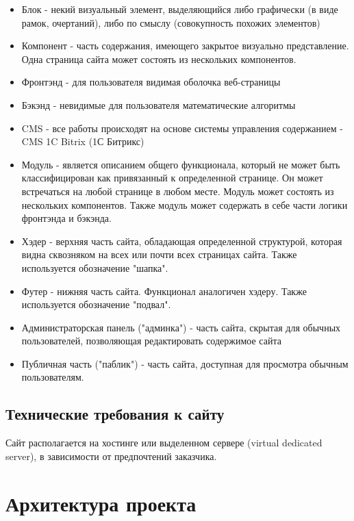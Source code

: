 \documentclass[DIV=calc, paper=a4, fontsize=11pt]{scrartcl} %
\begin{document}
        \begin{itemize}
        \item Блок - некий визуальный элемент, выделяющийся либо графически (в виде рамок, очертаний), либо по смыслу (совокупность похожих элементов)
        \item Компонент - часть содержания, имеющего закрытое визуально представление. Одна страница сайта может состоять из нескольких компонентов.
        \item Фронтэнд - для пользователя видимая оболочка веб-страницы
        \item Бэкэнд - невидимые для пользователя математические алгоритмы
        \item CMS - все работы происходят на основе системы управления содержанием - CMS 1C Bitrix (1С Битрикс)
        \item Модуль - является описанием общего функционала, который не может быть классифицирован как привязанный к определенной странице. Он может встречаться на любой странице в любом месте. Модуль может состоять из нескольких компонентов. Также модуль может содержать в себе части логики фронтэнда и бэкэнда.
        \item Хэдер - верхняя часть сайта, обладающая определенной структурой, которая видна сквозняком на всех или почти всех страницах сайта. Также используется обозначение "шапка".
        \item Футер - нижняя часть сайта. Функционал аналогичен хэдеру. Также используется обозначение "подвал".
        \item Администраторская панель ("админка") - часть сайта, скрытая для обычных пользователей, позволяющая редактировать содержимое сайта
        \item Публичная часть ("паблик") - часть сайта, доступная для просмотра обычным пользователям.

    \end{itemize}
    
\subsection{Технические требования к сайту}
Сайт располагается на хостинге или выделенном сервере (virtual dedicated server), в зависимости от предпочтений заказчика.



\section{Архитектура проекта}
\end{document}
